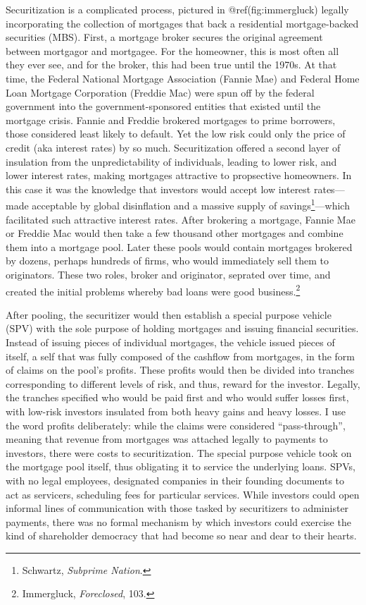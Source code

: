 \documentclass[
]{article}
\let\rmarkdownfootnote\footnote%
\def\footnote{\protect\rmarkdownfootnote}
\begin{document}
Securitization is a complicated process, pictured in
@ref(fig:immergluck) legally incorporating the collection of mortgages
that back a residential mortgage-backed securities (MBS). First, a
mortgage broker secures the original agreement between mortgagor and
mortgagee. For the homeowner, this is most often all they ever see, and
for the broker, this had been true until the 1970s. At that time, the
Federal National Mortgage Association (Fannie Mae) and Federal Home Loan
Mortgage Corporation (Freddie Mac) were spun off by the federal
government into the government-sponsored entities that existed until the
mortgage crisis. Fannie and Freddie brokered mortgages to prime
borrowers, those considered least likely to default. Yet the low risk
could only the price of credit (aka interest rates) by so much.
Securitization offered a second layer of insulation from the
unpredictability of individuals, leading to lower risk, and lower
interest rates, making mortgages attractive to propsective homeowners.
In this case it was the knowledge that investors would accept low
interest rates---made acceptable by global disinflation and a massive
supply of savings\footnote{Schwartz, \emph{Subprime Nation}.}---which
facilitated such attractive interest rates. After brokering a mortgage,
Fannie Mae or Freddie Mac would then take a few thousand other mortgages
and combine them into a mortgage pool. Later these pools would contain
mortgages brokered by dozens, perhaps hundreds of firms, who would
immediately sell them to originators. These two roles, broker and
originator, seprated over time, and created the initial problems whereby
bad loans were good business.\footnote{Immergluck, \emph{Foreclosed},
  103.}

After pooling, the securitizer would then establish a special purpose
vehicle (SPV) with the sole purpose of holding mortgages and issuing
financial securities. Instead of issuing pieces of individual mortgages,
the vehicle issued pieces of itself, a self that was fully composed of
the cashflow from mortgages, in the form of claims on the pool's
profits. These profits would then be divided into tranches corresponding
to different levels of risk, and thus, reward for the investor. Legally,
the tranches specified who would be paid first and who would suffer
losses first, with low-risk investors insulated from both heavy gains
and heavy losses. I use the word profits deliberately: while the claims
were considered ``pass-through'', meaning that revenue from mortgages
was attached legally to payments to investors, there were costs to
securitization. The special purpose vehicle took on the mortgage pool
itself, thus obligating it to service the underlying loans. SPVs, with
no legal employees, designated companies in their founding documents to
act as servicers, scheduling fees for particular services. While
investors could open informal lines of communication with those tasked
by securitizers to administer payments, there was no formal mechanism by
which investors could exercise the kind of shareholder democracy that
had become so near and dear to their hearts.
\end{document}
